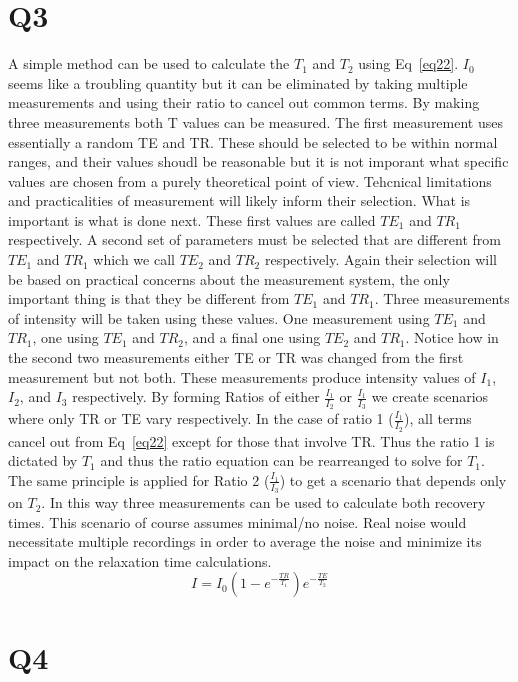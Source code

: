 \documentclass[12pt]{article}
\begin{document}
\section{Q3}
A simple method can be used to calculate the $T_1$ and $T_2$ using Eq~\ref{eq22}. $I_0$ seems like a troubling quantity but it can be eliminated by taking multiple measurements and using their ratio to cancel out common terms. By making three measurements both T values can be measured. The first measurement uses essentially a random TE and TR. These should be selected to be within normal ranges, and their values shoudl be reasonable but it is not imporant what specific values are chosen from a purely theoretical point of view. Tehcnical limitations and practicalities of measurement will likely inform their selection. What is important is what is done next. These first values are called $TE_1$ and $TR_1$ respectively. A second set of parameters must be selected that are different from  $TE_1$ and $TR_1$ which we call  $TE_2$ and $TR_2$ respectively. Again their selection will be based on practical concerns about the measurement system, the only important thing is that they be different from  $TE_1$ and $TR_1$. Three measurements of intensity will be taken using these values. One measurement using  $TE_1$ and $TR_1$, one using $TE_1$ and $TR_2$, and a final one using $TE_2$ and $TR_1$. Notice how in the second two measurements either TE or TR was changed from the first measurement but not both. These measurements produce intensity values of $I_1$, $I_2$, and $I_3$ respectively. By forming Ratios of either $\frac{I_1}{I_2}$ or $\frac{I_1}{I_3}$ we create scenarios where only TR or TE vary respectively. In the case of ratio 1 ($\frac{I_1}{I_2}$), all terms cancel out from Eq~\ref{eq22} except for those that involve TR. Thus the ratio 1 is dictated by $T_1$ and thus the ratio equation can be rearreanged to solve for $T_1$. The same principle is applied for Ratio 2 ($\frac{I_1}{I_3}$) to get a scenario that depends only on $T_2$. In this way three measurements can be used to calculate both recovery times. This scenario of course assumes minimal/no noise. Real noise would necessitate multiple recordings in order to average the noise and minimize its impact on the relaxation time calculations.
\begin{equation}
I = I_0(1-e^{-\frac{TR}{T_1}})e^{-\frac{TE}{T_2}}
\label{eq22}
\end{equation}

\section{Q4}
\end{document}

